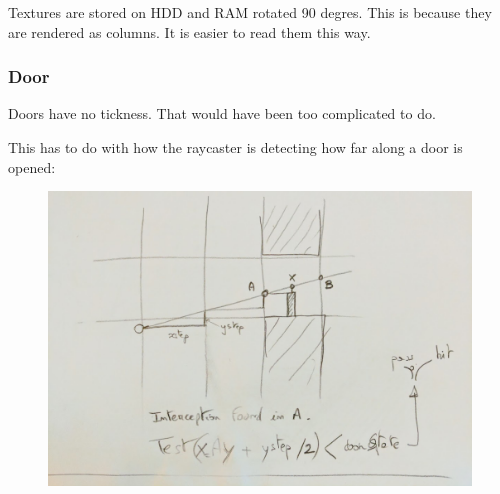  Textures are stored on HDD and RAM rotated 90 degres. This is because they are rendered as columns. It is easier to read them this way.\\
\par
{}

 





\subsubsection{Door}
Doors have no tickness. That would have been too complicated to do.\\
\par
\begin{figure}[H]
 \centering
\end{figure}

\par
This has to do with how the raycaster is detecting how far along a door is opened:\\

\begin{minipage}{\textwidth}

\end{minipage}

\par 
 \par
\begin{figure}[H]
  \centering
 \includegraphics[width=\textwidth]{imgs/drawings/test_door.png}
\end{figure}
\par












